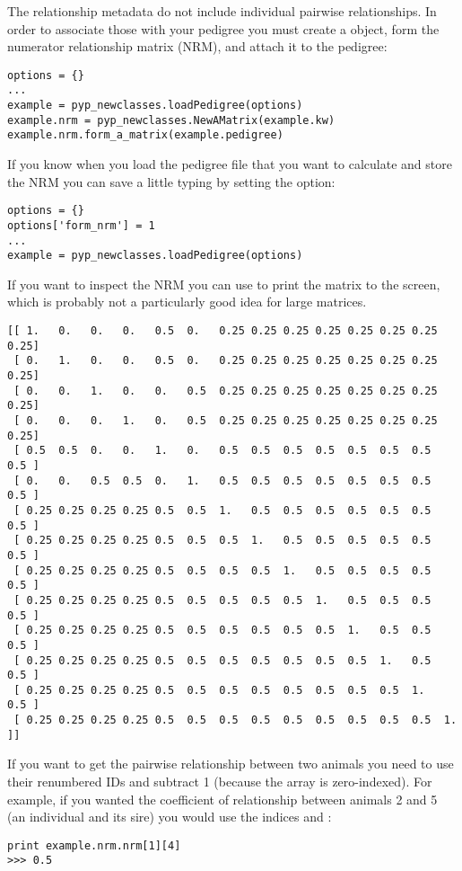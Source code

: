The relationship metadata do not include individual pairwise relationships. In order to associate those with your pedigree you must create a  object, form the numerator relationship matrix (NRM), and attach it to the pedigree:
\begin{verbatim}
options = {}
...
example = pyp_newclasses.loadPedigree(options)
example.nrm = pyp_newclasses.NewAMatrix(example.kw)
example.nrm.form_a_matrix(example.pedigree)
\end{verbatim}
If you know when you load the pedigree file  that you want to calculate and store the NRM you can save a little typing by setting the  option:
\begin{verbatim}
options = {}
options['form_nrm'] = 1
...
example = pyp_newclasses.loadPedigree(options)
\end{verbatim}
If you want to inspect the NRM you can use  to print the matrix to the screen, which is probably not a particularly good idea for large matrices.
\begin{verbatim}
[[ 1.   0.   0.   0.   0.5  0.   0.25 0.25 0.25 0.25 0.25 0.25 0.25 0.25]
 [ 0.   1.   0.   0.   0.5  0.   0.25 0.25 0.25 0.25 0.25 0.25 0.25 0.25]
 [ 0.   0.   1.   0.   0.   0.5  0.25 0.25 0.25 0.25 0.25 0.25 0.25 0.25]
 [ 0.   0.   0.   1.   0.   0.5  0.25 0.25 0.25 0.25 0.25 0.25 0.25 0.25]
 [ 0.5  0.5  0.   0.   1.   0.   0.5  0.5  0.5  0.5  0.5  0.5  0.5  0.5 ]
 [ 0.   0.   0.5  0.5  0.   1.   0.5  0.5  0.5  0.5  0.5  0.5  0.5  0.5 ]
 [ 0.25 0.25 0.25 0.25 0.5  0.5  1.   0.5  0.5  0.5  0.5  0.5  0.5  0.5 ]
 [ 0.25 0.25 0.25 0.25 0.5  0.5  0.5  1.   0.5  0.5  0.5  0.5  0.5  0.5 ]
 [ 0.25 0.25 0.25 0.25 0.5  0.5  0.5  0.5  1.   0.5  0.5  0.5  0.5  0.5 ]
 [ 0.25 0.25 0.25 0.25 0.5  0.5  0.5  0.5  0.5  1.   0.5  0.5  0.5  0.5 ]
 [ 0.25 0.25 0.25 0.25 0.5  0.5  0.5  0.5  0.5  0.5  1.   0.5  0.5  0.5 ]
 [ 0.25 0.25 0.25 0.25 0.5  0.5  0.5  0.5  0.5  0.5  0.5  1.   0.5  0.5 ]
 [ 0.25 0.25 0.25 0.25 0.5  0.5  0.5  0.5  0.5  0.5  0.5  0.5  1.   0.5 ]
 [ 0.25 0.25 0.25 0.25 0.5  0.5  0.5  0.5  0.5  0.5  0.5  0.5  0.5  1.  ]]
\end{verbatim}
If you want to get the pairwise relationship between two animals you need to use their renumbered IDs and subtract 1 (because the array is zero-indexed). For example, if you wanted the coefficient of relationship between animals 2 and 5 (an individual and its sire) you would use the indices  and :
\begin{verbatim}
print example.nrm.nrm[1][4]
>>> 0.5
\end{verbatim}

